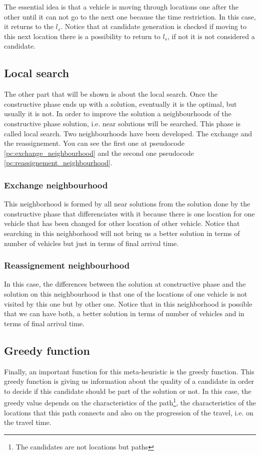 \documentclass[]{report}
\begin{document}
The essential idea is that a vehicle is moving through locations one after the other until it can not go to the next one because the time restriction. In this case, it returns to the $l_{s}$. Notice that at candidate generation is checked if moving to this next location there is a possibility to return to $l_{s}$, if not it is not considered a candidate.

\subsection{Local search}\label{ss:local_search}
The other part that will be shown is about the local search. Once the constructive phase ends up with a solution, eventually it is the optimal, but usually it is not. In order to improve the solution a neighbourhoods of the constructive phase solution, i.e. near solutions will be searched. This phase is called local search. Two neighbourhoods have been developed. The exchange and the reassignement. You can see the first one at pseudocode \ref{pc:exchange_neighbourhood} and the second one pseudocode \ref{pc:reassignement_neighbourhood}.

\subsubsection{Exchange neighbourhood}

This neighborhood is formed by all near solutions from the solution done by the constructive phase that differenciates with it because there is one location for one vehicle that has been changed for other location of other vehicle. Notice that searching in this neighborhood will not bring us a better solution in terms of number of vehicles but just in terms of final arrival time.

\subsubsection{Reassignement neighbourhood}

In this case, the differences between the solution at constructive phase and the solution on this neighbourhood is that one of the locations of one vehicle is not visited by this one but by other one. Notice that in this neighborhood is possible that we can have both, a better solution in terms of number of vehicles and in terms of final arrival time.

\subsection{Greedy function}
Finally, an important function for this meta-heuristic is the greedy function. This greedy function is giving us information about the quality of a candidate in order to decide if this candidate should be part of the solution or not. In this case, the greedy value depends on the characteristics of the path\footnote{The candidates are not locations but paths}, the characteristics of the locations that this path connects and also on the progression of the travel, i.e. on the travel time. 
\end{document}
